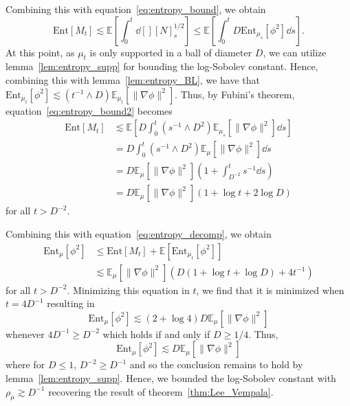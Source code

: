 Combining this with equation~\eqref{eq:entropy_bound}, we obtain
\begin{equation}\label{eq:entropy_bound2}
  \text{Ent}[M_t] \lesssim \mathbb{E}\left[\int_0^t \dd[] [N]_s^{1 / 2}\right]
    \le \mathbb{E}\left[\int_0^t D \text{Ent}_{\mu_s}[\phi^2] \dd s\right].
\end{equation}
At this point, as \(\mu_t\) is only supported in a ball of diameter \(D\), 
we can utilize lemma~\ref{lem:entropy_supp} for bounding the log-Sobolev constant.
Hence, combining this with lemma~\ref{lem:entropy_BL}, we have that 
\(\text{Ent}_{\mu_t}[\phi^2] \lesssim (t^{-1} \wedge D) \mathbb{E}_{\mu_t}[\|\nabla \phi\|^2]\). Thus, 
by Fubini's theorem, equation~\eqref{eq:entropy_bound2} becomes
\begin{align*}
  \text{Ent}[M_t] & \lesssim \mathbb{E}\left[D \int_0^t (s^{-1} \wedge D^2)\mathbb{E}_{\mu_s}[\|\nabla \phi\|^2] \dd s\right]\\
    & = D \int_0^t (s^{-1} \wedge D^2)\mathbb{E}_\mu[\|\nabla \phi\|^2] \dd s\\
    & = D \mathbb{E}_\mu[\|\nabla \phi\|^2] \left(1 + \int_{D^{-2}}^t s^{-1}\dd s\right)\\
    & = D \mathbb{E}_\mu[\|\nabla \phi\|^2] (1 + \log t + 2\log D)
\end{align*}
for all \(t > D^{-2}\).

Combining this with equation~\eqref{eq:entropy_decomp}, we obtain
\begin{align*}
  \text{Ent}_\mu[\phi^2] & \le \text{Ent}[M_t] + \mathbb{E}[\text{Ent}_{\mu_t}[\phi^2]]\\
  & \lesssim \mathbb{E}_\mu[\|\nabla \phi\|^2](D (1 + \log t + \log D) + 4t^{-1})
\end{align*}
for all \(t > D^{-2}\). Minimizing this equation in \(t\), we find that it is minimized when \(t = 4D^{-1}\) resulting in 
\[\text{Ent}_\mu[\phi^2] \lesssim (2 + \log 4)D\mathbb{E}_\mu[\|\nabla \phi\|^2]\]
whenever \(4D^{-1} \ge D^{-2}\) which holds if and only if \(D \ge 1 / 4\). Thus, 
\[\text{Ent}_\mu[\phi^2] \lesssim D \mathbb{E}_\mu[\|\nabla \phi\|^2]\]
where for \(D \le 1\), \(D^{-2} \ge D^{-1}\) and so the conclusion remains to hold by lemma~\ref{lem:entropy_supp}. 
Hence, we bounded the log-Sobolev constant with \(\rho_{\mu} \gtrsim D^{-1}\) recovering the result of theorem~\ref{thm:Lee_Vempala}.
